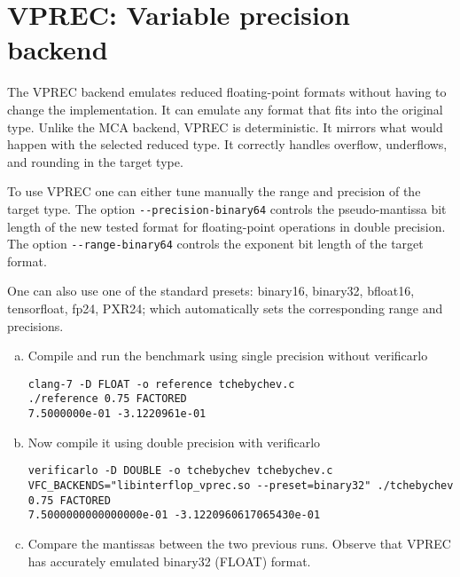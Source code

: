 \section{VPREC: Variable precision backend}

The VPREC backend emulates reduced floating-point formats without having to
change the implementation. It can emulate any format that fits into the original
type. Unlike the MCA backend, VPREC is deterministic. It mirrors what would happen
with the selected reduced type. It correctly handles overflow, underflows, and
rounding in the target type.

To use VPREC one can either tune manually the range and precision of the target
type. The option {\tt -{}-precision-binary64} controls the
pseudo-mantissa bit length of the new tested format for floating-point
operations in double precision. The option {\tt -{}-range-binary64}
controls the exponent bit length of the target format.

One can also use one of the standard presets: binary16, binary32, bfloat16,
tensorfloat, fp24, PXR24; which automatically sets the corresponding range and
precisions.

\begin{question}
    \begin{enumerate}[(a)]
        \item Compile and run the benchmark using single precision without verificarlo
              \begin{verbatim}
clang-7 -D FLOAT -o reference tchebychev.c
./reference 0.75 FACTORED
7.5000000e-01 -3.1220961e-01
\end{verbatim}
        \item Now compile it using double precision with verificarlo
              \begin{verbatim}
verificarlo -D DOUBLE -o tchebychev tchebychev.c
VFC_BACKENDS="libinterflop_vprec.so --preset=binary32" ./tchebychev 0.75 FACTORED
7.5000000000000000e-01 -3.1220960617065430e-01
\end{verbatim}
        \item Compare the mantissas between the two previous runs. Observe that VPREC has accurately emulated binary32 (FLOAT) format.
    \end{enumerate}
\end{question}

